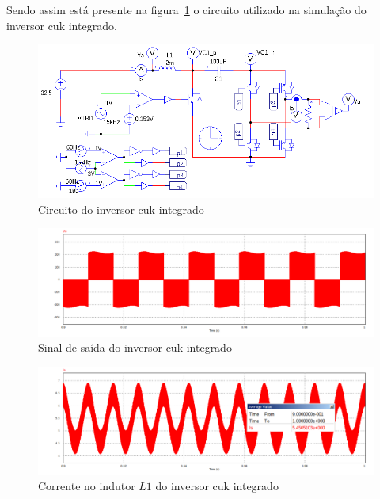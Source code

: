 \documentclass[
	12pt,				%
	openany,
	onseside,
	a4paper,			%
	english,			%
	french,				%
	spanish,			%
	brazil,				%
	]{abntex2}
\begin{document}
Sendo assim está presente na figura~\ref{fig:integ_cuk_met} o circuito utilizado na simulação do inversor cuk integrado.

\begin{figure}[htbp]%
	\begin{center}%
		\includegraphics[width= \linewidth]{integ_cuk_circ_psim}
		\caption{Circuito do inversor cuk integrado}
		\label{fig:integ_cuk_met}
	\end{center}
\end{figure}

\begin{figure}[H]%
	\centering
		\includegraphics[width= \linewidth]{cuk_integ_Vout}
		\caption{Sinal de saída do inversor cuk integrado}
		\label{fig:cuk_integ_ripp_V_out}
\end{figure}

\begin{figure}[H]%
	\centering
		\includegraphics[width= \linewidth]{cuk_integ_IL1}
		\caption{Corrente no indutor $L1$ do inversor cuk integrado}
		\label{fig:cuk_integ_I_L1}
\end{figure}
\end{document}
